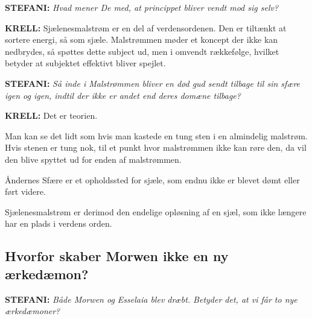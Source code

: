 \documentclass[a4paper,12pt]{memoir}
\begin{document}
\noindent
{\sffamily\bfseries\color{Maroon!90!black} STEFANI:}
\textit{Hvad mener De med, at princippet bliver vendt mod sig
selv?}

\par\smallskip

\noindent
{\sffamily\bfseries KRELL:}
Sjælenesmalstrøm er en del af verdensordenen. Den er tiltænkt at sortere energi, så som sjæle. Malstrømmen møder et koncept der ikke kan nedbrydes, så spøttes dette subject ud, men i omvendt rækkefølge, hvilket betyder at subjektet effektivt bliver spejlet.


\par\medskip

\noindent
{\sffamily\bfseries\color{Maroon!90!black} STEFANI:}
\textit{Så inde i Malstrømmen bliver en død gud sendt tilbage til
sin sfære igen og igen, indtil der ikke er andet end deres domæne
tilbage?}

\par\smallskip

\noindent
{\sffamily\bfseries KRELL:}
Det er teorien.

Man kan se det lidt som hvis man kastede en tung sten i en almindelig malstrøm. Hvis stenen er tung nok, til et punkt hvor malstrømmen ikke kan røre den, da vil den blive spyttet ud for enden af malstrømmen.

\begin{tcolorbox}[
  enhanced,
  colback=Goldenrod!8,
  colframe=Goldenrod!70!black,
  boxrule=0.8pt,
  sharp corners,
  title={\sffamily\bfseries IKKE DET SAMME SOM ÅNDERNES SFÆRE},
  colbacktitle=Goldenrod!70!black,
  coltitle=black,
  fontupper=\small
]
Åndernes Sfære er et opholdssted for sjæle, som endnu ikke
er blevet dømt eller ført videre.

Sjælenesmalstrøm er derimod den endelige opløsning af en
sjæl, som ikke længere har en plads i verdens orden.

\end{tcolorbox}


\subsection*{Hvorfor skaber Morwen ikke en ny ærkedæmon?}

\noindent
{\sffamily\bfseries\color{Maroon!90!black} STEFANI:}
\textit{Både Morwen og Esselaia blev dræbt. Betyder det,
at vi får to nye ærkedæmoner?}

\par\smallskip
\end{document}

